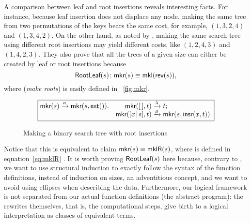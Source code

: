 A comparison between leaf and root insertions reveals interesting
facts. For instance, because leaf insertion does not displace any
node, making the same tree from two permutations of the keys bears the
same cost, for example, \((1,3,2,4)\) and \((1,3,4,2)\). On the other
hand, as noted by \cite{GeldenhuysVanderMerwe_2009}, making the same
search tree using different root insertions may yield different costs,
like \((1,2,4,3)\) and \((1,4,2,3)\). They also prove that all the
trees of a given size can either be created by leaf or root insertions
because
\begin{equation}
\pred{RootLeaf}{s} \colon \fun{mkr}(s) \equiv \fun{mkl}(\fun{rev}(s)),
\label{thm:RootLeaf}
\index{RootLeaf@\predName{RootLeaf}}
\end{equation}
where  
(\emph{make roots}) is easily defined in \fig~\vref{fig:mkr}.
\begin{figure}
\begin{equation*}
\boxed{
\begin{array}{@{}r@{\;}l@{\;}lr@{\;}l@{\;}l@{}}
\fun{mkr}(s) & \xrightarrow{\smash{\kappa}} &
\fun{mkr}(s,\fun{ext}()).
& \fun{mkr}(\el,t) & \xrightarrow{\smash{\lambda}} & t;\\
&&&\fun{mkr}(\cons{x}{s},t) & \xrightarrow{\smash{\mu}} & \fun{mkr}(s,\fun{insr}(x,t)).
\end{array}}
\end{equation*}
\caption{Making a binary search tree with root insertions
\label{fig:mkr}}
\end{figure}
Notice that this is equivalent to claim \(\textsf{mkr}(s) \equiv
\textsf{mklR}(s)\), where  is defined in
equation~\eqref{eq:mklR} . It is worth proving
\(\textsf{RootLeaf}({s})\) here because, contrary to
\cite{GeldenhuysVanderMerwe_2009}, we want to use structural induction
to exactly follow the syntax of the function definitions, instead of
induction on sizes, an adventitious concept, and we want to avoid
using ellipses when describing the data. Furthermore, our logical
framework is not separated from our actual function definitions (the
abstract program): the rewrites themselves, that is, the computational
steps, give birth to a logical interpretation as classes of equivalent
terms.

